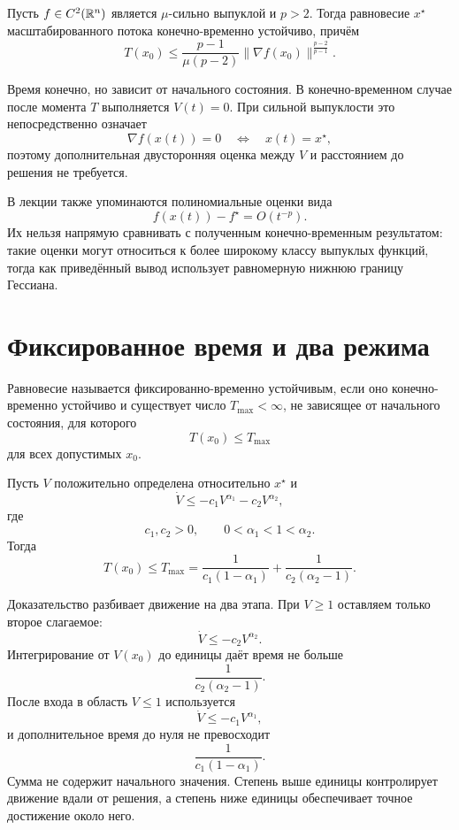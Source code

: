 \begin{theorem}
Пусть \(f\in C^2(\mathbb{R}^n)\) является \(\mu\)-сильно выпуклой и
\(p>2\). Тогда равновесие \(x^\star\) масштабированного потока
конечно-временно устойчиво, причём
\[
    T(x_0)
    \le
    \frac{p-1}{\mu(p-2)}
    \lVert\nabla f(x_0)\rVert^{\frac{p-2}{p-1}}.
\]
\end{theorem}

Время конечно, но зависит от начального состояния. В конечно-временном
случае после момента \(T\) выполняется \(V(t)=0\). При сильной
выпуклости это непосредственно означает
\[
    \nabla f(x(t))=0
    \quad\Longleftrightarrow\quad
    x(t)=x^\star,
\]
поэтому дополнительная двусторонняя оценка между \(V\) и расстоянием
до решения не требуется.

В лекции также упоминаются полиномиальные оценки вида
\[
    f(x(t))-f^\star=O(t^{-p}).
\]
Их нельзя напрямую сравнивать с полученным конечно-временным
результатом: такие оценки могут относиться к более широкому классу
выпуклых функций, тогда как приведённый вывод использует равномерную
нижнюю границу Гессиана.

\section{Фиксированное время и два режима}

\begin{definition}
Равновесие называется фиксированно-временно устойчивым, если оно
конечно-временно устойчиво и существует число \(T_{\max}<\infty\), не
зависящее от начального состояния, для которого
\[
    T(x_0)\le T_{\max}
\]
для всех допустимых \(x_0\).
\end{definition}

\begin{theorem}
Пусть \(V\) положительно определена относительно \(x^\star\) и
\[
    \dot V
    \le
    -c_1V^{\alpha_1}
    -c_2V^{\alpha_2},
\]
где
\[
    c_1,c_2>0,
    \qquad
    0<\alpha_1<1<\alpha_2.
\]
Тогда
\[
    T(x_0)
    \le
    T_{\max}
    =
    \frac1{c_1(1-\alpha_1)}
    +
    \frac1{c_2(\alpha_2-1)}.
\]
\end{theorem}

Доказательство разбивает движение на два этапа. При \(V\ge1\)
оставляем только второе слагаемое:
\[
    \dot V\le-c_2V^{\alpha_2}.
\]
Интегрирование от \(V(x_0)\) до единицы даёт время не больше
\[
    \frac1{c_2(\alpha_2-1)}.
\]
После входа в область \(V\le1\) используется
\[
    \dot V\le-c_1V^{\alpha_1},
\]
и дополнительное время до нуля не превосходит
\[
    \frac1{c_1(1-\alpha_1)}.
\]
Сумма не содержит начального значения. Степень выше единицы
контролирует движение вдали от решения, а степень ниже единицы
обеспечивает точное достижение около него.

